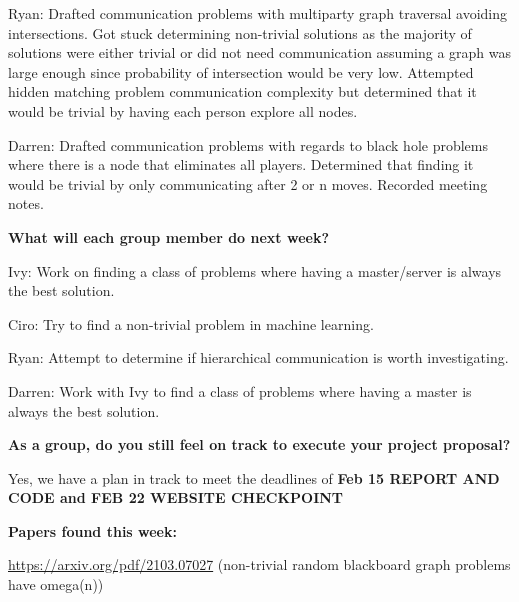 Ryan: Drafted communication problems with multiparty graph traversal
avoiding intersections. Got stuck determining non-trivial solutions as
the majority of solutions were either trivial or did not need
communication assuming a graph was large enough since probability of
intersection would be very low. Attempted hidden matching problem
communication complexity but determined that it would be trivial by
having each person explore all nodes.

Darren: Drafted communication problems with regards to black hole
problems where there is a node that eliminates all players. Determined
that finding it would be trivial by only communicating after 2 or n
moves. Recorded meeting notes.

\textbf{What will each group member do next week?}

Ivy: Work on finding a class of problems where having a master/server is
always the best solution.

Ciro: Try to find a non-trivial problem in machine learning.

Ryan: Attempt to determine if hierarchical communication is worth
investigating.

Darren: Work with Ivy to find a class of problems where having a master
is always the best solution.

\textbf{As a group, do you still feel on track to execute your project
proposal?}

Yes, we have a plan in track to meet the deadlines of \textbf{Feb 15
REPORT AND CODE and FEB 22 WEBSITE CHECKPOINT}

\textbf{Papers found this week:}

\url{https://arxiv.org/pdf/2103.07027} (non-trivial random blackboard
graph problems have omega(n))

